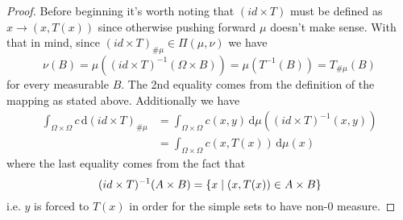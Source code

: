 \documentclass{article}
\newcommand{\push}[2]{#1_{\##2}}
\begin{document}
\begin{proof}
  Before beginning it's worth noting that $(id \times T)$ must be defined as $x \to (x, T(x))$ since otherwise pushing forward $\mu$ doesn't make sense. With that in mind, since $\push{(id \times T)}{\mu} \in \Pi(\mu, \nu)$ we have
  $$
  \nu(B) = \mu((id \times T)^{-1}(\Omega \times B)) = \mu(T^{-1}(B)) = \push{T}{\mu}(B)
  $$
  for every measurable $B$. The 2nd equality comes from the definition of the mapping as stated above. Additionally we have
  \begin{align*}
    \int_{\Omega \times \Omega} c \, \mathrm{d} \push{(id \times T)}{\mu}
    &= \int_{\Omega \times \Omega} c(x, y) \, \mathrm{d} \mu( (id \times T)^{-1} (x, y) ) \\
    &= \int_{\Omega \times \Omega} c(x, T(x)) \, \mathrm{d} \mu(x)
  \end{align*}
  where the last equality comes from the fact that
  $$
  (id \times T)^{-1} (A \times B) = \{ x \mid (x, T(x)) \in A \times B \}
  $$
  i.e. $y$ is forced to $T(x)$ in order for the simple sets to have non-0 measure.
\end{proof}



\end{document}
